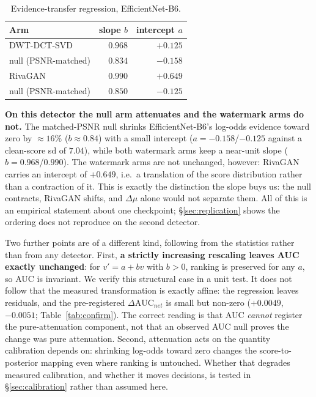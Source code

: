 \documentclass[journal]{IEEEtran}
\begin{document}
\begin{table}[t]
\centering
\caption{Evidence-transfer regression, EfficientNet-B6.}
\label{tab:transfer}
\footnotesize
\begin{tabular}{lrr}
\toprule
Arm & slope $b$ & intercept $a$ \\
\midrule
DWT-DCT-SVD & $0.968$ & $+0.125$ \\
null (PSNR-matched) & $\mathbf{0.834}$ & $-0.158$ \\
RivaGAN & $0.990$ & $+0.649$ \\
null (PSNR-matched) & $\mathbf{0.850}$ & $-0.125$ \\
\bottomrule
\end{tabular}
\end{table}

\textbf{On this detector the null arm attenuates and the watermark arms do
not.} The matched-PSNR null shrinks EfficientNet-B6's log-odds evidence toward
zero by $\approx 16\%$ ($b\approx0.84$) with a small intercept
($a=-0.158$/$-0.125$ against a clean-score sd of $7.04$), while both watermark
arms keep a near-unit slope ($b=0.968$/$0.990$). The watermark arms are not
unchanged, however: RivaGAN carries an intercept of $+0.649$, i.e.\ a
translation of the score distribution rather than a contraction of it. This
is exactly the distinction the slope buys us: the null contracts, RivaGAN
shifts, and $\Delta\mu$ alone would not separate them. All of this is an
empirical statement about one checkpoint; \S\ref{sec:replication} shows the
ordering does not reproduce on the second detector.

Two further points are of a different kind, following from the statistics
rather than from any detector. First, \textbf{a strictly increasing rescaling
leaves AUC exactly unchanged}: for $v' = a + bv$ with $b>0$, ranking is
preserved for any $a$, so AUC is invariant. We verify this structural case in
a unit test. It does not follow that the measured transformation is exactly
affine: the regression leaves residuals, and the pre-registered
$\Delta\mathrm{AUC}_{net}$ is small but non-zero ($+0.0049$, $-0.0051$;
Table~\ref{tab:confirm}). The correct reading is that AUC \emph{cannot}
register the pure-attenuation component, not that an observed AUC null proves
the change was pure attenuation. Second, attenuation acts on the quantity
calibration depends on: shrinking log-odds toward zero changes the
score-to-posterior mapping even where ranking is untouched. Whether that
degrades measured calibration, and whether it moves decisions, is tested in
\S\ref{sec:calibration} rather than assumed here.
\end{document}
